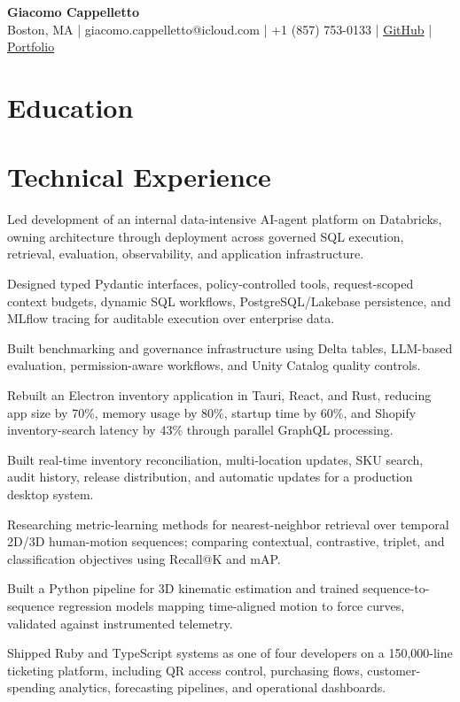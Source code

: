 \documentclass[letterpaper,10pt]{article}
\begin{document}
{\Large\textbf{Giacomo Cappelletto}}\\[-1pt]Boston, MA | giacomo.cappelletto@icloud.com | +1 (857) 753-0133 | \href{https://github.com/JJCAPPE}{GitHub} | \href{https://cv-nu-sage.vercel.app/}{Portfolio}
\section{Education}
\section{Technical Experience}
\bi
\item Led development of an internal data-intensive AI-agent platform on Databricks, owning architecture through deployment across governed SQL execution, retrieval, evaluation, observability, and application infrastructure.
\item Designed typed Pydantic interfaces, policy-controlled tools, request-scoped context budgets, dynamic SQL workflows, PostgreSQL/Lakebase persistence, and MLflow tracing for auditable execution over enterprise data.
\item Built benchmarking and governance infrastructure using Delta tables, LLM-based evaluation, permission-aware workflows, and Unity Catalog quality controls.\ei
{}\bi
\item Rebuilt an Electron inventory application in Tauri, React, and Rust, reducing app size by 70\%, memory usage by 80\%, startup time by 60\%, and Shopify inventory-search latency by 43\% through parallel GraphQL processing.
\item Built real-time inventory reconciliation, multi-location updates, SKU search, audit history, release distribution, and automatic updates for a production desktop system.\ei
{}\bi
\item Researching metric-learning methods for nearest-neighbor retrieval over temporal 2D/3D human-motion sequences; comparing contextual, contrastive, triplet, and classification objectives using Recall@K and mAP.\ei
{}\bi
\item Built a Python pipeline for 3D kinematic estimation and trained sequence-to-sequence regression models mapping time-aligned motion to force curves, validated against instrumented telemetry.\ei
{}\bi
\item Shipped Ruby and TypeScript systems as one of four developers on a 150,000-line ticketing platform, including QR access control, purchasing flows, customer-spending analytics, forecasting pipelines, and operational dashboards.\ei
\end{document}

